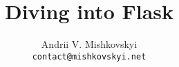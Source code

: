 \documentclass{beamer}
\title{Diving into Flask}
\author[A. Mishkovskyi]{Andrii V. Mishkovskyi \\ \texttt{contact@mishkovskyi.net}}
\date[EuroPython 2012]
\begin{document}
\begin{frame}
\end{frame}
\end{document}
